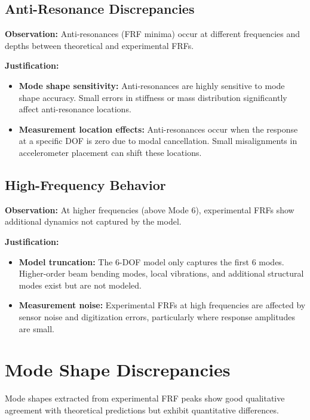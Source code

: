 \documentclass[11pt,a4paper]{article}
\begin{document}
\subsection{Anti-Resonance Discrepancies}

\textbf{Observation:} Anti-resonances (FRF minima) occur at different frequencies and depths between theoretical and experimental FRFs.

\textbf{Justification:}
\begin{itemize}[leftmargin=*]
    \item \textbf{Mode shape sensitivity:} Anti-resonances are highly sensitive to mode shape accuracy. Small errors in stiffness or mass distribution significantly affect anti-resonance locations.

    \item \textbf{Measurement location effects:} Anti-resonances occur when the response at a specific DOF is zero due to modal cancellation. Small misalignments in accelerometer placement can shift these locations.
\end{itemize}

\subsection{High-Frequency Behavior}

\textbf{Observation:} At higher frequencies (above Mode 6), experimental FRFs show additional dynamics not captured by the model.

\textbf{Justification:}
\begin{itemize}[leftmargin=*]
    \item \textbf{Model truncation:} The 6-DOF model only captures the first 6 modes. Higher-order beam bending modes, local vibrations, and additional structural modes exist but are not modeled.

    \item \textbf{Measurement noise:} Experimental FRFs at high frequencies are affected by sensor noise and digitization errors, particularly where response amplitudes are small.
\end{itemize}

\section{Mode Shape Discrepancies}

Mode shapes extracted from experimental FRF peaks show good qualitative agreement with theoretical predictions but exhibit quantitative differences.
\end{document}
